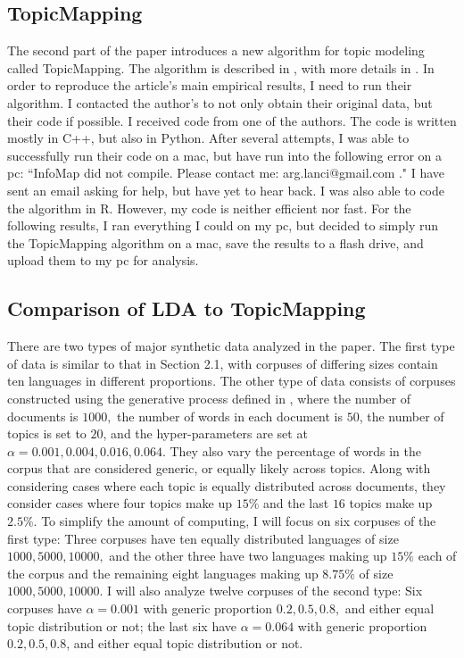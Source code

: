 \documentclass[12pt]{article}
\begin{document}
\subsection{TopicMapping}

The second part of the paper introduces a new algorithm for topic modeling called TopicMapping. The algorithm is described in \cite{main}, with more details in \cite{mainExtra}. In order to reproduce the article's main empirical results, I need to run their algorithm. I contacted the author's to not only obtain their original data, but their code if possible. I received code from one of the authors. The code is written mostly in C++, but also in Python. After several attempts, I was able to successfully run their code on a mac, but have run into the following error on a pc:  ``InfoMap did not compile. Please contact me: arg.lanci@gmail.com ." I have sent an email asking for help, but have yet to hear back. I was also able to code the algorithm in R. However, my code is neither efficient nor fast. For the following results, I ran everything I could on my pc, but decided to simply run the TopicMapping algorithm on a mac, save the results to a flash drive, and upload them to my pc for analysis. 

\subsection{Comparison of LDA to TopicMapping}

There are two types of major synthetic data analyzed in the paper. The first type of data is similar to that in Section 2.1, with corpuses of differing sizes contain ten languages in different proportions. The other type of data consists of corpuses constructed using the generative process defined in \cite{lda}, where the number of documents is $1000,$ the number of words in each document is $50$, the number of topics is set to $20$, and the hyper-parameters are set at $\alpha=0.001,0.004,0.016,0.064$. They also vary the percentage of words in the corpus that are considered generic, or equally likely across topics. Along with considering cases where each topic is equally distributed across documents, they consider cases where four topics make up $15\%$ and the last $16$ topics make up $2.5\%$. To simplify the amount of computing, I will focus on six corpuses of the first type:  Three corpuses have ten equally distributed languages of size $1000, 5000, 10000,$ and the other three have two languages making up $15\%$ each of the corpus and the remaining eight languages making up $8.75\%$ of size $1000, 5000, 10000$. I will also analyze twelve corpuses of the second type:  Six corpuses have $\alpha=0.001$ with generic proportion $0.2, 0.5, 0.8,$ and either equal topic distribution or not; the last six have $\alpha=0.064$ with generic proportion $0.2, 0.5, 0.8$, and either equal topic distribution or not.
\\
\end{document}

